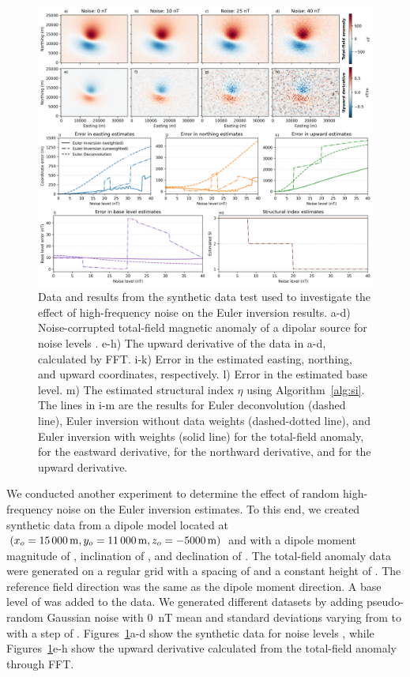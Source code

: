 \begin{figure}[tb!]
\centering
\includegraphics[width=1\linewidth]{euler-inversion/figures/synthetic-noise-levels.png}
\caption{
    Data and results from the synthetic data test used to investigate the effect of high-frequency noise on the Euler inversion results.
    a-d) Noise-corrupted total-field magnetic anomaly of a dipolar source for noise levels \SynNoisePlotted.
    e-h) The upward derivative of the data in a-d, calculated by FFT.
    i-k) Error in the estimated easting, northing, and upward coordinates, respectively.
    l) Error in the estimated base level.
    m) The estimated structural index $\eta$ using Algorithm~\ref{alg:si}.
    The lines in i-m are the results for Euler deconvolution (dashed line), Euler inversion without data weights (dashed-dotted line), and Euler inversion with weights (solid line) \SynNoiseWeightsF{} for the total-field anomaly, \SynNoiseWeightsE{} for the eastward derivative, \SynNoiseWeightsN{} for the northward derivative, and \SynNoiseWeightsU{} for the upward derivative.
}
\label{fig:noise}
\end{figure}

We conducted another experiment to determine the effect of random high-frequency noise on the Euler inversion estimates.
To this end, we created synthetic data from a dipole model located at $(x_o=\SynNoiseTrueEast, y_o=\SynNoiseTrueNorth, z_o=\SynNoiseTrueUp)$ and with a dipole moment magnitude of \SynNoiseInt{}, inclination of \SynNoiseInc, and declination of \SynNoiseDec.
The total-field anomaly data were generated on a regular grid with a spacing of \SynNoiseSpacing{} and a constant height of \SynNoiseHeight.
The reference field direction was the same as the dipole moment direction.
A base level of \SynNoiseTrueBase{} was added to the data.
We generated different datasets by adding pseudo-random Gaussian noise with \qty{0}{\nano\tesla} mean and standard deviations varying from \SynNoiseMin{} to \SynNoiseMax{} with a step of \SynNoiseStep{}.
Figures~\ref{fig:noise}a-d show the synthetic data for noise levels \SynNoisePlotted, while Figures~\ref{fig:noise}e-h show the upward derivative calculated from the total-field anomaly through FFT.

